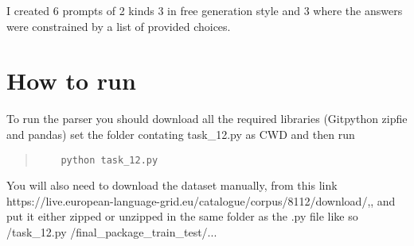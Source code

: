 \documentclass[11pt]{article}
\begin{document}
I created 6 prompts of 2 kinds 3 in free generation style and 3 where the answers were constrained by a list of provided 
choices.

\section{How to run}
To run the parser you should download all the required libraries (Gitpython zipfie and pandas) set the folder contating 
task\_12.py as CWD and then run
\begin{quote}
  \begin{verbatim}
    python task_12.py
  \end{verbatim}
\end{quote}
\noindent You will also need to download the dataset manually, 
from this link https://live.european-language-grid.eu/catalogue/corpus/8112/download/,, and put it either 
zipped or unzipped in the same folder as the .py file like so /task\_12.py /final\_package\_train\_test/...

\newpage
\end{document}
